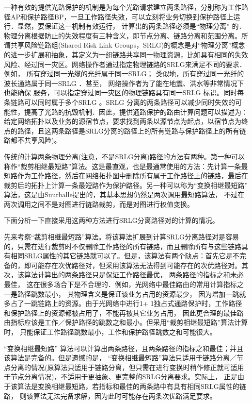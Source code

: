 一种有效的提供光路保护的机制是为每个光路请求建立两条路径，分别称为工作路径AP和保护路径BP，一旦工作路径失效，可以立刻将业务切换到保护路径上运行．显然，要保证这一机制有效运行， 计算出的两条路径必须是“物理分离” 的．物理分离根据防止的失效程度有三种含义，即节点分离、链路分离和范围分离。所谓共享风险链路组(Shared Risk Link Groups，SRLG)的概念是对“物理分离”概念的进一步扩展和抽象，其定义为一组链路共享同一物理资源，比如具有相同的失效风险、经过同一灾区。网络操作者通过指定物理链路的SRLG来满足不同的要求．例如， 所有穿过同一光缆的光纤属于同一SRLG； 类似地，所有穿过同一光纤的波长通路属于同一SRLG ．甚至， 网络操作者为了能在地震、洪水等非常情况下也能确保
服务，可以指定穿过同一灾区的物理链路具有同一SRLG 标识。同时每条链路可以同时属于多个SRLG 。SRLG 分离的两条路径可以减少同时失效的可能性，提高了光路的抗毁机制．因此，提供通路保护的路由计算问题可以描述为：给定网络拓扑以及业务的源宿节点，要求找到两条以源节点为起点，以宿节点为终点的路径，且这两条路径是SRLG分离的路径上的所有链路与保护路径上的所有链路都不共享风险)。

传统的计算两条物理分离(注意，不是SRLG分离)路径的方法有两种。第一种可以称作“裁剪相继最短路”算法。这是最直观，也是最通常使用的方法：先计算一条最短路作为工作路径，然后在网络拓扑图中删除所有属于工作路径上的链路，最后在裁剪后的拓扑上计算一条最短路作为保护路径。另一种可以称为“变换相继最短路” 算法，这是由Suurballe提出的，其基本思想仍然是两次调用最短路算法， 不过在两次调用之间不是对图进行链路裁剪，而是对图进行权值变换。

下面分析一下直接采用这两种方法进行SRLG分离路径对的计算的情况。

先来考察“裁剪相继最短路”算法。将该算法扩展到计算SRLG分离路径对是容易的，只需在进行裁剪时不仅删除工作路径的所有链路，而且删除所有与这些链路具有相同SRLG属性的其它链路就可以了。但是，该算法有两个缺点：首先它是不完备的，即可能存在次优路径对，但采用该算法无法得到可能存在的次优路径对。其次，该算法计算出的两条路径只是保证工作路径最优， 两条路径的指标之和未必最佳， 这在很多场合下是不合理的．例如，光网络中最佳路由的常用计算指标之一是路径跳数最小， 其物理含义是保证该业务占用的资源最少， 因为增加一跳就多占了一跳链路上的资源。由于光网络中进行1+ 1独占式通路保护时，工作路径和保护路径上的资源都被占用了，不能再被其它业务占用， 因此更合理的最佳路由指标应该是工作／保护路径的跳数之和最小。但采用“裁剪相继最短路”算法计算时， 只能保证工作路径跳数最小，工作和保护路径跳数之和可能很大。

“变换相继最短路” 算法可以计算出两条路径，且两条路径的指标之和最佳；并且该算法是完备的。但是遗憾的是， “变换相继最短路”算法只适用于链路分离／节点分离的情况(原算法只适用于链路分离，但只需在进行变换时稍作修正就可适用于节点分离情况)，不适用于更抽象、更完整的SRLG分离要求。实际上， 正是由于该算法是变换相继最短路，若指标和最佳的两条路中有具有相同SRLG属性的链路， 则该算法无法完备求解，因为此时可能存在两条次优路满足要求。

